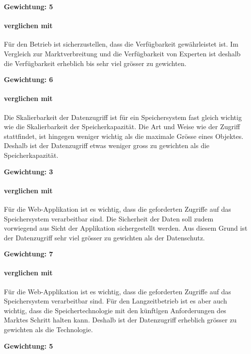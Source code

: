 \textbf{Gewichtung: 5}

\paragraph*{ verglichen mit }
Für den Betrieb ist sicherzustellen, dass die Verfügbarkeit gewährleistet ist. Im Vergleich zur Marktverbreitung und die Verfügbarkeit von Experten ist deshalb die Verfügbarkeit erheblich bis sehr viel grösser zu gewichten.

\textbf{Gewichtung: 6}

\paragraph*{ verglichen mit }
Die Skalierbarkeit der Datenzugriff ist für ein Speichersystem fast gleich wichtig wie die Skalierbarkeit der Speicherkapazität. Die Art und Weise wie der Zugriff stattfindet, ist hingegen weniger wichtig als die maximale Grösse eines Objektes. Deshalb ist der Datenzugriff etwas weniger gross zu gewichten als die Speicherkapazität. 

\textbf{Gewichtung: 3}

\paragraph*{ verglichen mit }
Für die Web-Applikation ist es wichtig, dass die geforderten Zugriffe auf das Speichersystem verarbeitbar sind. Die Sicherheit der Daten soll zudem vorwiegend aus Sicht der Applikation sichergestellt werden. Aus diesem Grund ist der Datenzugriff sehr viel grösser zu gewichten als der Datenschutz.

\textbf{Gewichtung: 7}

\paragraph*{ verglichen mit }
Für die Web-Applikation ist es wichtig, dass die geforderten Zugriffe auf das Speichersystem verarbeitbar sind. Für den Langzeitbetrieb ist es aber auch wichtig, dass die Speichertechnologie mit den künftîgen Anforderungen des Marktes Schritt halten kann. Deshalb ist der Datenzugriff erheblich grösser zu gewichten als die Technologie.

\textbf{Gewichtung: 5}

